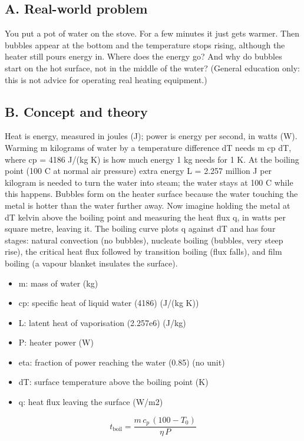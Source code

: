 \documentclass[11pt,a4paper]{article}
\begin{document}
\subsection*{A. Real-world problem}
You put a pot of water on the stove. For a few minutes it just gets warmer. Then bubbles appear at the bottom and the temperature stops rising, although the heater still pours energy in. Where does the energy go? And why do bubbles start on the hot surface, not in the middle of the water? (General education only: this is not advice for operating real heating equipment.)

\subsection*{B. Concept and theory}
Heat is energy, measured in joules (J); power is energy per second, in watts (W). Warming m kilograms of water by a temperature difference dT needs m cp dT, where cp = 4186 J/(kg K) is how much energy 1 kg needs for 1 K. At the boiling point (100 C at normal air pressure) extra energy L = 2.257 million J per kilogram is needed to turn the water into steam; the water stays at 100 C while this happens. Bubbles form on the heater surface because the water touching the metal is hotter than the water further away. Now imagine holding the metal at dT kelvin above the boiling point and measuring the heat flux q, in watts per square metre, leaving it. The boiling curve plots q against dT and has four stages: natural convection (no bubbles), nucleate boiling (bubbles, very steep rise), the critical heat flux followed by transition boiling (flux falls), and film boiling (a vapour blanket insulates the surface).

\begin{itemize}[nosep]
\item m: mass of water (kg)
\item cp: specific heat of liquid water (4186) (J/(kg K))
\item L: latent heat of vaporisation (2.257e6) (J/kg)
\item P: heater power (W)
\item eta: fraction of power reaching the water (0.85) (no unit)
\item dT: surface temperature above the boiling point (K)
\item q: heat flux leaving the surface (W/m2)
\end{itemize}

\begin{equation*}
t_{\mathrm{boil}}=\frac{m\,c_p\,(100-T_0)}{\eta\,P}
\end{equation*}
\end{document}
